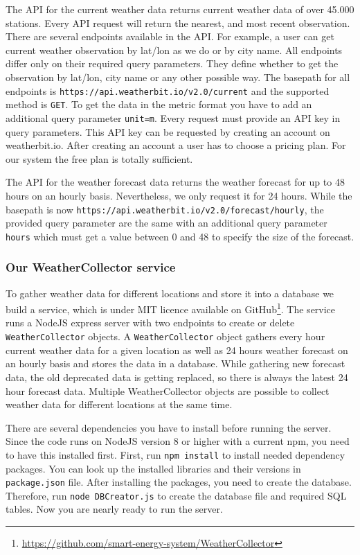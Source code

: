The API for the current weather data returns current weather data of over 45.000 stations.
Every API request will return the nearest, and most recent observation.
There are several endpoints available in the API.
For example, a user can get current weather observation by lat/lon as we do or by city name.
All endpoints differ only on their required query parameters.
They define whether to get the observation by lat/lon, city name or any other possible way.
The basepath for all endpoints is \texttt{https://api.weatherbit.io/v2.0/current} and the supported method is \texttt{GET}.
To get the data in the metric format you have to add an additional query parameter \texttt{unit=m}.
Every request must provide an API key in query parameters.\cite{weatherbit}
This API key can be requested by creating an account on weatherbit.io.
After creating an account a user has to choose a pricing plan.
For our system the free plan is totally sufficient.

The API for the weather forecast data returns the weather forecast for up to 48 hours on an hourly basis.
Nevertheless, we only request it for 24 hours.
While the basepath is now \texttt{https://api.weatherbit.io/v2.0/forecast/hourly}, the provided query parameter are the same with an additional query parameter \texttt{hours} which must get a value between 0 and 48 to specify the size of the forecast.

\subsubsection{Our WeatherCollector service}\label{sec:weathercollector}
To gather weather data for different locations and store it into a database we build a service, which is under MIT licence available on GitHub\footnote{\url{https://github.com/smart-energy-system/WeatherCollector}}.
The service runs a NodeJS express server with two endpoints to create or delete \texttt{WeatherCollector} objects. 
A \texttt{WeatherCollector} object gathers every hour current weather data for a given location as well as 24 hours weather forecast on an hourly basis and stores the data in a database. 
While gathering new forecast data, the old deprecated data is getting replaced, so there is always the latest 24 hour forecast data. Multiple WeatherCollector objects are possible to collect weather data for different locations at the same time.

There are several dependencies you have to install before running the server. 
Since the code runs on NodeJS version 8 or higher with a current npm, you need to have this installed first.
First, run \texttt{npm install} to install needed dependency packages. 
You can look up the installed libraries and their versions in \texttt{package.json} file. 
After installing the packages, you need to create the database. 
Therefore, run \texttt{node DBCreator.js} to create the database file and required SQL tables. 
Now you are nearly ready to run the server.

